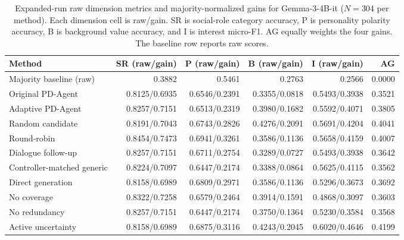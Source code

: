 \documentclass{ieeeaccess}
\begin{document}
\renewcommand{\thetable}{S3d}
\begin{table}[H]
\centering
\footnotesize
\setlength{\tabcolsep}{4pt}
\caption{Expanded-run raw dimension metrics and majority-normalized gains for Gemma-3-4B-it ($N=304$ per method). Each dimension cell is raw/gain. SR is social-role category
accuracy, P is personality polarity accuracy, B is background value accuracy, and I is
interest micro-F1. AG equally weights the four gains. The baseline row reports raw scores.}
\label{tab:expanded-raw-gemma}
\begin{tabular*}{\textwidth}{@{\extracolsep{\fill}}lrrrrr@{}}
\toprule
Method & SR (raw/gain) & P (raw/gain) & B (raw/gain) & I (raw/gain) & AG \\
\midrule
Majority baseline (raw) & 0.3882 & 0.5461 & 0.2763 & 0.2566 & 0.0000 \\
\midrule
Original PD-Agent & 0.8125/0.6935 & 0.6546/0.2391 & 0.3355/0.0818 & 0.5493/0.3938 & 0.3521 \\
Adaptive PD-Agent & 0.8257/0.7151 & 0.6513/0.2319 & 0.3980/0.1682 & 0.5592/0.4071 & 0.3805 \\
Random candidate & 0.8191/0.7043 & 0.6743/0.2826 & 0.4276/0.2091 & 0.5691/0.4204 & 0.4041 \\
Round-robin & 0.8454/0.7473 & 0.6941/0.3261 & 0.3586/0.1136 & 0.5658/0.4159 & 0.4007 \\
Dialogue follow-up & 0.8257/0.7151 & 0.6711/0.2754 & 0.3289/0.0727 & 0.5493/0.3938 & 0.3642 \\
Controller-matched generic & 0.8224/0.7097 & 0.6447/0.2174 & 0.3388/0.0864 & 0.5625/0.4115 & 0.3562 \\
Direct generation & 0.8158/0.6989 & 0.6809/0.2971 & 0.3586/0.1136 & 0.5296/0.3673 & 0.3692 \\
No coverage & 0.8322/0.7258 & 0.6579/0.2464 & 0.3914/0.1591 & 0.4868/0.3097 & 0.3603 \\
No redundancy & 0.8257/0.7151 & 0.6447/0.2174 & 0.3750/0.1364 & 0.5230/0.3584 & 0.3568 \\
Active uncertainty & 0.8158/0.6989 & 0.6875/0.3116 & 0.4243/0.2045 & 0.6020/0.4646 & 0.4199 \\
\bottomrule
\end{tabular*}
\end{table}
\end{document}
